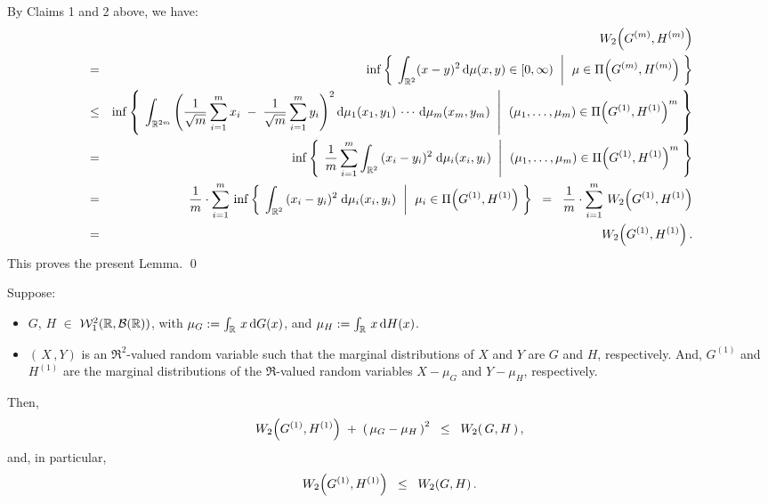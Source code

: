 \vskip 1.0cm
\noindent
By Claims 1 and 2 above, we have:
\begin{eqnarray*}
&&
	W_{2}\!\left(G^{(m)},H^{(m)}\right)
\\
& = &
	\inf\left\{\; \left. \int_{\mathbb{R}^{2}}(x - y)^{2}\,\textnormal{d}\mu(x,y) \in [0,\infty) \;\;\right\vert\;\, \mu \in \Pi\!\left(G^{(m)},H^{(m)}\right) \;\right\}
\\
&\leq&
	\inf\left\{\; \left.
	\int_{\mathbb{R}^{2m}}\left(\dfrac{1}{\sqrt{m}}\sum_{i=1}^{m}x_{i} \;-\; \dfrac{1}{\sqrt{m}}\sum_{i=1}^{m}y_{i}\right)^{2}
	\textnormal{d}\mu_{1}(x_{1},y_{1})\,\cdots\,\textnormal{d}\mu_{m}(x_{m},y_{m})
	\;\;\right\vert\;\,
	(\mu_{1},\ldots,\mu_{m}) \in \Pi\!\left(G^{(1)},H^{(1)}\right)^{m}
	\;\right\}
\\
&=&
	\inf\left\{\; \left.
	\dfrac{1}{m}\sum_{i=1}^{m}\int_{\mathbb{R}^{2}}\,(x_{i}-y_{i})^{2}\;\textnormal{d}\mu_{i}(x_{i},y_{i})	
	\;\;\right\vert\;\,
	(\mu_{1},\ldots,\mu_{m}) \in \Pi\!\left(G^{(1)},H^{(1)}\right)^{m}
	\;\right\}
\\
&=&
	\dfrac{1}{m}\cdot\sum_{i=1}^{m}\,
	\inf\left\{\; \left.
	\int_{\mathbb{R}^{2}}\,(x_{i}-y_{i})^{2}\;\textnormal{d}\mu_{i}(x_{i},y_{i})	
	\;\;\right\vert\;\,
	\mu_{i} \in \Pi\!\left(G^{(1)},H^{(1)}\right)
	\;\right\}
\;\;=\;\;
	\dfrac{1}{m}\cdot\sum_{i=1}^{m} \, W_{2}\!\left(G^{(1)},H^{(1)}\right)
\\
&=&
	W_{2}\!\left(G^{(1)},H^{(1)}\right).
\end{eqnarray*}
This proves the present Lemma.
\qed

\begin{lemma}
\mbox{}\vskip 0.1cm
\noindent
Suppose:
\begin{itemize}
\item
	$G$, $H$ $\in$ $\mathcal{W}^{2}_{1}\!\left(\mathbb{R},\mathcal{B}(\mathbb{R})\right)$, with $\mu_{G} := \int_{\mathbb{R}}\,x\,\textnormal{d} G(x)$, and $\mu_{H} := \int_{\mathbb{R}}\,x\,\textnormal{d} H(x)$.
\item
	$\left(\,X\,,Y\right)$ is an $\Re^{2}$-valued random variable such that
	the marginal distributions of $X$ and $Y$ are $G$ and $H$, respectively.
	And, $G^{(1)}$ and $H^{(1)}$ are the marginal distributions of the
	$\Re$-valued random variables $X - \mu_{G}$ and $Y - \mu_{H}$, respectively.
\end{itemize}
Then,
\begin{equation*}
W_{2}\!\left(G^{(1)},H^{(1)}\right) \;+\; \left(\,\mu_{G} - \mu_{H}\,\right)^{2}
\;\; \leq \;\; W_{2}\!\left(\,G,H\,\right),
\end{equation*}
and, in particular,
\begin{equation*}
W_{2}\!\left(G^{(1)},H^{(1)}\right) \;\;\leq\;\; W_{2}\!\left(G,H\right).
\end{equation*}
\end{lemma}

